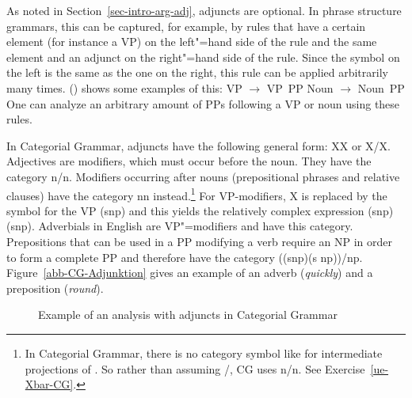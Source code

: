 As noted in Section~\ref{sec-intro-arg-adj}, adjuncts are optional. In phrase
structure grammars, this can be captured, for example, by rules that have a certain element (for
instance a VP) on the left"=hand side of the rule and the same element and an adjunct on the
right"=hand side of the rule. Since the symbol on the left is the same as the one on the right, this rule can be
applied arbitrarily many times. () shows some examples of this:
\eal
\ex VP $\to$ VP~PP
\ex Noun $\to$ Noun~PP
\zl
One can analyze an arbitrary amount of PPs following a VP or noun using these rules.

In Categorial Grammar, adjuncts have the following general form: X\bs X or X/X.
Adjectives are modifiers, which must occur before the noun. They have the category n/n.
Modifiers occurring after nouns (prepositional phrases and relative clauses) have the category
n\bs n instead.\footnote{%
	In Categorial Grammar, there is no category symbol like \xbar for intermediate projections of
	\xbart. So rather than assuming \nbar/\nbar, CG uses n/n. See Exercise~\ref{ue-Xbar-CG}.
} For VP-modifiers, X is replaced by the symbol for the VP (s\bs np) and this yields the relatively complex expression (s\bs np)\bs (s\bs np).
Adverbials in English are VP"=modifiers and have this category. Prepositions that can be used in a PP modifying a verb require an NP in order to
form a complete PP and therefore have the category ((s\bs np)\bs (s\bs
np))/np. Figure~\vref{abb-CG-Adjunktion} gives an example of an adverb (\emph{quickly}) and a preposition (\emph{round}). 
%
\begin{figure}
\caption{\label{abb-CG-Adjunktion}Example of an analysis with adjuncts in Categorial Grammar}
\end{figure}%
